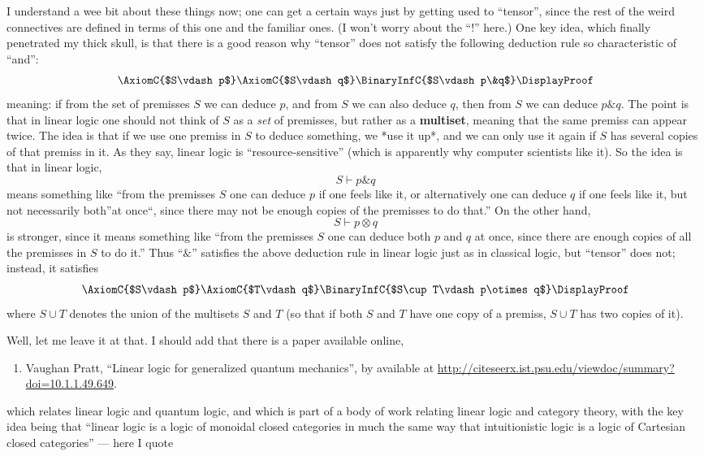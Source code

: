 \documentclass{article}
\def\tightlist{}
\begin{document}
I understand a wee bit about these things now; one can get a certain
ways just by getting used to ``tensor'', since the rest of the weird
connectives are defined in terms of this one and the familiar ones. (I
won't worry about the ``\(!\)'' here.) One key idea, which finally
penetrated my thick skull, is that there is a good reason why ``tensor''
does not satisfy the following deduction rule so characteristic of
``and'':
\[\AxiomC{$S\vdash p$}\AxiomC{$S\vdash q$}\BinaryInfC{$S\vdash p\&q$}\DisplayProof\]
meaning: if from the set of premisses \(S\) we can deduce \(p\), and
from \(S\) we can also deduce \(q\), then from \(S\) we can deduce
\(p\&q\). The point is that in linear logic one should not think of
\(S\) as a \emph{set} of premisses, but rather as a \textbf{multiset},
meaning that the same premiss can appear twice. The idea is that if we
use one premiss in \(S\) to deduce something, we *use it up*, and we can
only use it again if \(S\) has several copies of that premiss in it. As
they say, linear logic is ``resource-sensitive'' (which is apparently
why computer scientists like it). So the idea is that in linear logic,
\[S\vdash p\&q\] means something like ``from the premisses \(S\) one can
deduce \(p\) if one feels like it, or alternatively one can deduce \(q\)
if one feels like it, but not necessarily both''at once``, since there
may not be enough copies of the premisses to do that.'' On the other
hand, \[S\vdash p\otimes q\] is stronger, since it means something like
``from the premisses \(S\) one can deduce both \(p\) and \(q\) at once,
since there are enough copies of all the premisses in \(S\) to do it.''
Thus ``\(\&\)'' satisfies the above deduction rule in linear logic just
as in classical logic, but ``tensor'' does not; instead, it satisfies
\[\AxiomC{$S\vdash p$}\AxiomC{$T\vdash q$}\BinaryInfC{$S\cup T\vdash p\otimes q$}\DisplayProof\]
where \(S \cup T\) denotes the union of the multisets \(S\) and \(T\)
(so that if both \(S\) and \(T\) have one copy of a premiss,
\(S \cup T\) has two copies of it).

Well, let me leave it at that. I should add that there is a paper
available online,

\begin{enumerate}
\def\labelenumi{\arabic{enumi})}
\setcounter{enumi}{1}
\tightlist
\item
 Vaughan Pratt, ``Linear logic for generalized quantum mechanics'', by 
  available at \href{http://citeseerx.ist.psu.edu/viewdoc/summary?doi=10.1.1.49.649}{http://citeseerx.ist.psu.edu/viewdoc/summary?doi=10.1.1.49.649}.
\end{enumerate}
\noindent
which relates linear logic and quantum logic, and which is part of a
body of work relating linear logic and category theory, with the key
idea being that ``linear logic is a logic of monoidal closed categories
in much the same way that intuitionistic logic is a logic of Cartesian
closed categories'' --- here I quote
\end{document}
